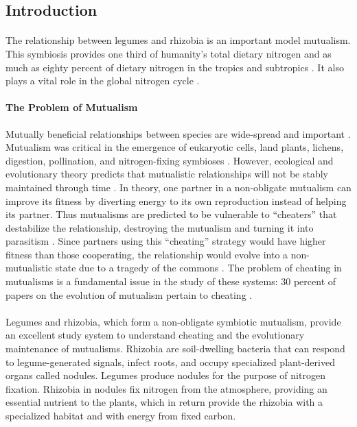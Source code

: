 \documentclass[12pt]{article}
\begin{document}
	
		\newpage
\begin{doublespace} %
	\graphicspath{ {/home/ellie/Documents/Figures/} } %
	

\section{Introduction}
	\paragraph{} %
The relationship between legumes and rhizobia is an important model mutualism. This symbiosis provides one third of humanity's total dietary nitrogen and as much as eighty percent of dietary nitrogen in the tropics and subtropics \cite{Vance2002}. It also plays a vital role in the global nitrogen cycle \cite{Gruber2008}. 

	\paragraph{The Problem of Mutualism}
Mutually beneficial relationships between species are wide-spread and important \cite{Bronstein2015}. Mutualism was critical in the emergence of eukaryotic cells, land plants, lichens, digestion, pollination, and nitrogen-fixing symbioses \cite{Bronstein2015}. However, ecological and evolutionary theory predicts that mutualistic relationships will not be stably maintained through time \cite{May1973}. In theory, one partner in a non-obligate mutualism can improve its fitness by diverting energy to its own reproduction instead of helping its partner. Thus mutualisms are predicted to be vulnerable to ``cheaters'' that destabilize the relationship, destroying the mutualism and turning it into parasitism \cite{Axelrod1981}. Since partners using this ``cheating'' strategy would have higher fitness than those cooperating, the relationship would evolve into a non-mutualistic state due to a tragedy of the commons \cite{Hardin1968}. The problem of cheating in mutualisms is a fundamental issue in the study of these systems: 30 percent of papers on the evolution of mutualism pertain to cheating \cite{Jones2015}. 

	\paragraph{} %
Legumes and rhizobia, which form a non-obligate symbiotic mutualism, provide an excellent study system to understand cheating and the evolutionary maintenance of mutualisms. Rhizobia are soil-dwelling bacteria that can respond to legume-generated signals, infect roots, and occupy specialized plant-derived organs called nodules. Legumes produce nodules for the purpose of nitrogen fixation. Rhizobia in nodules fix nitrogen from the atmosphere, providing an essential nutrient to the plants, which in return provide the rhizobia with a specialized habitat and with energy from fixed carbon.

\end{doublespace}
\end{document}
